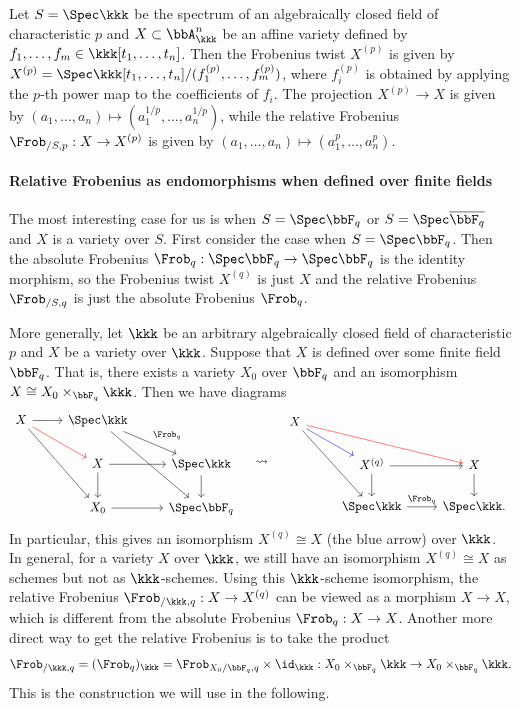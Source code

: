   \begin{example}
    Let $S = \Spec \kkk$ be the spectrum of an algebraically closed field of characteristic $p$ and $X \subset \bbA^n_\kkk$ be an affine variety defined by $f_1, \dots, f_m \in \kkk[t_1, \dots, t_n]$.
    Then the Frobenius twist $X^{(p)}$ is given by $X^{(p)} = \Spec \kkk[t_1, \dots, t_n]/(f_1^{(p)}, \dots, f_m^{(p)})$, where $f_i^{(p)}$ is obtained by applying the $p$-th power map to the coefficients of $f_i$.
    The projection $X^{(p)} \to X$ is given by $(a_1, \dots, a_n) \mapsto (a_1^{1/p}, \dots, a_n^{1/p})$, while the relative Frobenius $\Frob_{/S,p}: X \to X^{(p)}$ is given by $(a_1, \dots, a_n) \mapsto (a_1^p, \dots, a_n^p)$.
  \end{example}

  \paragraph{Relative Frobenius as endomorphisms when defined over finite fields}
  The most interesting case for us is when $S = \Spec \bbF_q$ or $S = \Spec \overline{\bbF_q}$ and $X$ is a variety over $S$.
  First consider the case when $S = \Spec \bbF_q$.
  Then the absolute Frobenius $\Frob_q: \Spec \bbF_q \to \Spec \bbF_q$ is the identity morphism, so the Frobenius twist $X^{(q)}$ is just $X$ and the relative Frobenius $\Frob_{/S,q}$ is just the absolute Frobenius $\Frob_q$.
  
  More generally, let $\kkk$ be an arbitrary algebraically closed field of characteristic $p$ and $X$ be a variety over $\kkk$.
  Suppose that $X$ is defined over some finite field $\bbF_q$.
  That is, there exists a variety $X_0$ over $\bbF_q$ and an isomorphism $X \cong X_0 \times_{\bbF_q} \kkk$.
  Then we have diagrams
  \[ 
    \begin{tikzcd}
      X \arrow[r] \arrow[rdd] \arrow[rd, red] & \Spec \kkk \arrow[rd, "\Frob_q"] \arrow[rdd] & \\
      & X \arrow[r] \arrow[d] & \Spec \kkk \arrow[d] \\
      & X_0 \arrow[r] & \Spec \bbF_q
    \end{tikzcd}
    \quad \leadsto \quad
    \begin{tikzcd}
      X \arrow[rrd, red] \arrow[rdd] \arrow[rd, blue] & & \\
      & X^{(q)} \arrow[r] \arrow[d] & X \arrow[d] \\
      & \Spec \kkk \arrow[r, "\Frob_q"] & \Spec \kkk.
    \end{tikzcd} 
  \]
  In particular, this gives an isomorphism $X^{(q)} \cong X$ (the blue arrow) over $\kkk$.
  In general, for a variety $X$ over $\kkk$, we still have an isomorphism $X^{(q)} \cong X$ as schemes but not as $\kkk$-schemes.
  Using this $\kkk$-scheme isomorphism, the relative Frobenius $\Frob_{/\kkk,q}: X \to X^{(q)}$ can be viewed as a morphism $X \to X$, which is different from the absolute Frobenius $\Frob_q: X \to X$.
  Another more direct way to get the relative Frobenius is to take the product 
  \[ \Frob_{/\kkk,q} = (\Frob_{q})_\kkk = \Frob_{X_0/\bbF_q, q} \times \id_\kkk: X_0 \times_{\bbF_q} \kkk \to X_0 \times_{\bbF_q} \kkk. \]
  This is the construction we will use in the following.

